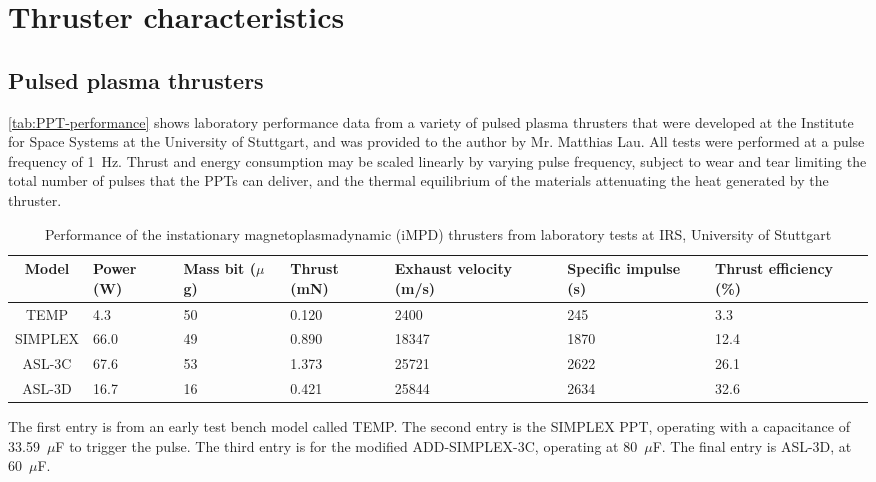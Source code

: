 \chapter{Thruster characteristics} \label{cha:Thruster-characteristics}

\section{Pulsed plasma thrusters}\label{sec:PPT-characteristics}

\autoref{tab:PPT-performance} shows laboratory performance data from a variety of pulsed plasma thrusters that were developed at the Institute for Space Systems at the University of Stuttgart, and was provided to the author by Mr. Matthias Lau. All tests were performed at a pulse frequency of 1~Hz. Thrust and energy consumption may be scaled linearly by varying pulse frequency, subject to wear and tear limiting the total number of pulses that the PPTs can deliver, and the thermal equilibrium of the materials attenuating the heat generated by the thruster.

\begin{table}[h]
\caption{Performance of the instationary magnetoplasmadynamic (iMPD) thrusters from laboratory tests at IRS, University of Stuttgart}
\label{tab:PPT-performance}
\begin{center}
\begin{tabular}{c C{0.1\textwidth} C{0.1\textwidth} C{0.1\textwidth} C{0.12\textwidth} C{0.12\textwidth} C{0.13\textwidth}}\toprule
Model & Power (W) &  Mass bit ($\mu$g) & Thrust (mN) & Exhaust velocity (m/s) & Specific impulse (s) & Thrust efficiency (\%) \tabularnewline\midrule
TEMP & 4.3 & 50 & 0.120 & 2400 & 245 & 3.3 \tabularnewline
SIMPLEX & 66.0 & 49 & 0.890 &  18347 & 1870 & 12.4 \tabularnewline
ASL-3C & 67.6 & 53 & 1.373 & 25721 & 2622 & 26.1 \tabularnewline
ASL-3D & 16.7 & 16 & 0.421 & 25844 & 2634 & 32.6 \tabularnewline\bottomrule
\end{tabular}
\end{center}
\end{table}

The first entry is from an early test bench model called TEMP. The second entry is the SIMPLEX PPT, operating with a capacitance of 33.59~$\mu$F to trigger the pulse. The third entry is for the modified ADD-SIMPLEX-3C, operating at 80~$\mu$F. The final entry is ASL-3D, at 60~$\mu$F.


